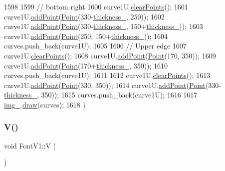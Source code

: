 \begin{DoxyCode}
1598 
1599     \textcolor{comment}{// bottom right}
1600     curve1U.\mbox{\hyperlink{class_bezier_curve_a0ba8ce66d5af5971ae6a1b506029728e}{clearPoints}}();
1601     curve1U.\mbox{\hyperlink{class_bezier_curve_a38d16c18b36ae45619b05e26e226cf34}{addPoint}}(\mbox{\hyperlink{class_point}{Point}}(330-\mbox{\hyperlink{class_font_v1_aed8040e76be9a52833627b92f0fb4e5f}{thickness\_}}, 250));
1602     curve1U.\mbox{\hyperlink{class_bezier_curve_a38d16c18b36ae45619b05e26e226cf34}{addPoint}}(\mbox{\hyperlink{class_point}{Point}}(330-\mbox{\hyperlink{class_font_v1_aed8040e76be9a52833627b92f0fb4e5f}{thickness\_}}, 150+\mbox{\hyperlink{class_font_v1_aed8040e76be9a52833627b92f0fb4e5f}{thickness\_}}));
1603     curve1U.\mbox{\hyperlink{class_bezier_curve_a38d16c18b36ae45619b05e26e226cf34}{addPoint}}(\mbox{\hyperlink{class_point}{Point}}(250, 150+\mbox{\hyperlink{class_font_v1_aed8040e76be9a52833627b92f0fb4e5f}{thickness\_}}));
1604     curves.push\_back(curve1U);
1605 
1606     \textcolor{comment}{// Upper edge}
1607     curve1U.\mbox{\hyperlink{class_bezier_curve_a0ba8ce66d5af5971ae6a1b506029728e}{clearPoints}}();
1608     curve1U.\mbox{\hyperlink{class_bezier_curve_a38d16c18b36ae45619b05e26e226cf34}{addPoint}}(\mbox{\hyperlink{class_point}{Point}}(170, 350));
1609     curve1U.\mbox{\hyperlink{class_bezier_curve_a38d16c18b36ae45619b05e26e226cf34}{addPoint}}(\mbox{\hyperlink{class_point}{Point}}(170+\mbox{\hyperlink{class_font_v1_aed8040e76be9a52833627b92f0fb4e5f}{thickness\_}}, 350));
1610     curves.push\_back(curve1U);
1611 
1612     curve1U.\mbox{\hyperlink{class_bezier_curve_a0ba8ce66d5af5971ae6a1b506029728e}{clearPoints}}();
1613     curve1U.\mbox{\hyperlink{class_bezier_curve_a38d16c18b36ae45619b05e26e226cf34}{addPoint}}(\mbox{\hyperlink{class_point}{Point}}(330, 350));
1614     curve1U.\mbox{\hyperlink{class_bezier_curve_a38d16c18b36ae45619b05e26e226cf34}{addPoint}}(\mbox{\hyperlink{class_point}{Point}}(330-\mbox{\hyperlink{class_font_v1_aed8040e76be9a52833627b92f0fb4e5f}{thickness\_}}, 350));
1615     curves.push\_back(curve1U);
1616 
1617     \mbox{\hyperlink{class_font_v1_a00569e3e3c4b70f437b63f396f735fb0}{img\_}}.\mbox{\hyperlink{class_image_a8d162f3cab956131d58708c09aa560b0}{draw}}(curves);
1618 \}
\end{DoxyCode}
\mbox{\label{class_font_v1_aa5937063bd49c25ccd8993d375926fb7}} 
\subsubsection{\texorpdfstring{V()}{V()}}
{\footnotesize\ttfamily void Font\+V1\+::V (\begin{DoxyParamCaption}{ }\end{DoxyParamCaption})}



